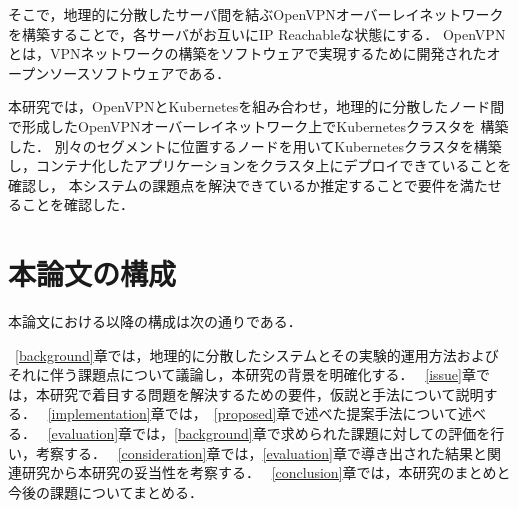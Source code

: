 そこで，地理的に分散したサーバ間を結ぶOpenVPNオーバーレイネットワークを構築することで，各サーバがお互いにIP Reachableな状態にする．
OpenVPNとは，VPNネットワークの構築をソフトウェアで実現するために開発されたオープンソースソフトウェアである．

本研究では，OpenVPNとKubernetesを組み合わせ，地理的に分散したノード間で形成したOpenVPNオーバーレイネットワーク上でKubernetesクラスタを
構築した．
別々のセグメントに位置するノードを用いてKubernetesクラスタを構築し，コンテナ化したアプリケーションをクラスタ上にデプロイできていることを確認し，
本システムの課題点を解決できているか推定することで要件を満たせることを確認した．

\section{本論文の構成}
\label{introduction:structure}

本論文における以降の構成は次の通りである．

~\ref{background}章では，地理的に分散したシステムとその実験的運用方法およびそれに伴う課題点について議論し，本研究の背景を明確化する．
~\ref{issue}章では，本研究で着目する問題を解決するための要件，仮説と手法について説明する．
~\ref{implementation}章では，~\ref{proposed}章で述べた提案手法について述べる．
~\ref{evaluation}章では，\ref{background}章で求められた課題に対しての評価を行い，考察する．
~\ref{consideration}章では，\ref{evaluation}章で導き出された結果と関連研究から本研究の妥当性を考察する．
~\ref{conclusion}章では，本研究のまとめと今後の課題についてまとめる．

